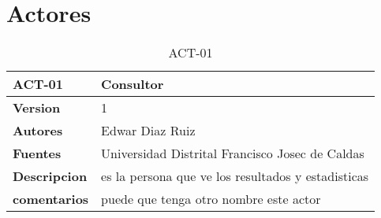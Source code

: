 \section{Actores}

\begin{table}[H]
	\centering
	\caption{ACT-01}
	\label{ACT-01}
	\begin{tabular}{|l|l|}
		\hline
		\textbf{ACT-01}      & \textbf{Consultor}                                 \\ \hline
		\textbf{Version}     & 1                                                  \\ \hline
		\textbf{Autores}     & Edwar Diaz Ruiz                                    \\ \hline
		\textbf{Fuentes}     & Universidad Distrital Francisco Josec de Caldas    \\ \hline
		\textbf{Descripcion} & es la persona que ve los resultados y estadisticas \\ \hline
		\textbf{comentarios} & puede que tenga otro nombre este actor             \\ \hline
	\end{tabular}
\end{table}